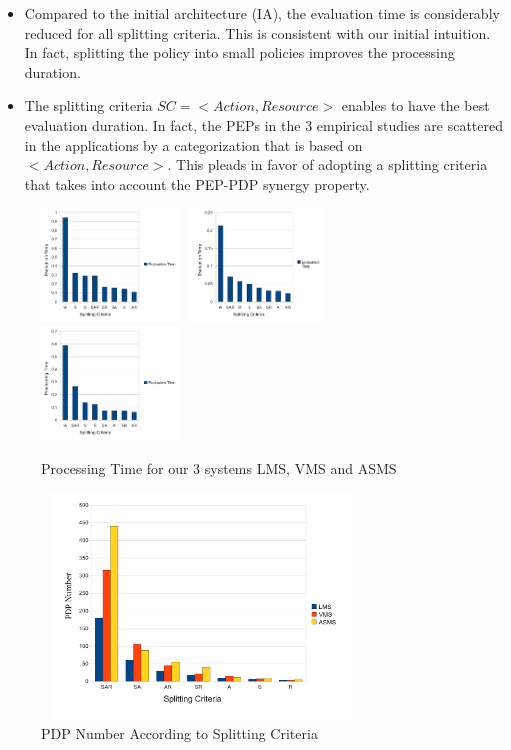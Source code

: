 \begin{itemize} 
\item Compared to the initial architecture (IA), the evaluation time is considerably reduced for all splitting criteria. This is consistent with our 
initial intuition. In fact, splitting the policy into small policies improves the processing duration.
\item The splitting criteria \normalsize $SC=< Action, Resource>$ enables to have the best evaluation duration. 
In fact, the PEPs in the 3 empirical studies are scattered in the applications by a categorization
 that is based on $<Action, Resource>$. This pleads in favor of adopting a
 splitting criteria that takes into account the PEP-PDP synergy property.
\end{itemize} 
\begin{figure}
  \centering
{\label{fig:gull}\includegraphics[width=0.33\textwidth]{LMS.pdf}}                
{\label{fig:VMS}\includegraphics[width=0.33\textwidth]{VMS.pdf}}
{\label{fig:ASMS}\includegraphics[width=0.33\textwidth]{ASMS.pdf}}
  \caption{Processing Time for our 3 systems LMS, VMS and ASMS}
  \label{fig:processing time}
\end{figure}
\begin{figure}[!h]
  \centering
\includegraphics[width=8.5cm, height=6cm]{pdpnumber.pdf}
\begin{center}
\caption{PDP Number According to Splitting Criteria}
\label{pdpnumber}
\end{center}
\end{figure} 
